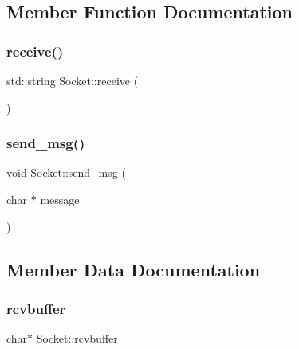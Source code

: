 \subsection{Member Function Documentation}
\mbox{\label{class_socket_a93675446d84c9856a4d7493f99d1e064}} 
\subsubsection{\texorpdfstring{receive()}{receive()}}
{\footnotesize\ttfamily std\+::string Socket\+::receive (\begin{DoxyParamCaption}{ }\end{DoxyParamCaption})}

\mbox{\label{class_socket_a39eaf88b49360805f252506d301cf1c4}} 
\subsubsection{\texorpdfstring{send\+\_\+msg()}{send\_msg()}}
{\footnotesize\ttfamily void Socket\+::send\+\_\+msg (\begin{DoxyParamCaption}\item[{char $\ast$}]{message }\end{DoxyParamCaption})}



\subsection{Member Data Documentation}
\mbox{\label{class_socket_af6c5600b809c80996f76a5fb143af4e8}} 
\subsubsection{\texorpdfstring{rcvbuffer}{rcvbuffer}}
{\footnotesize\ttfamily char$\ast$ Socket\+::rcvbuffer\hspace{0.3cm}{\ttfamily [private]}}

\mbox{\label{class_socket_a08722f899fe7248e6bd122f5c241872b}} 
